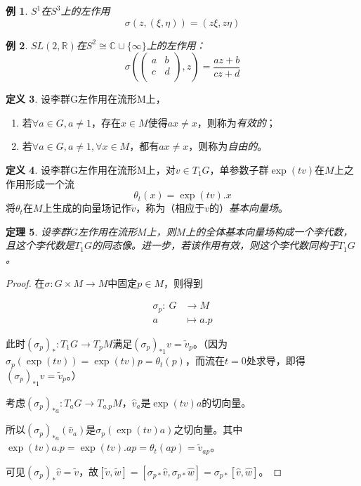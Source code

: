 \documentclass[winfonts,UTF8,c5size,a4paper,fancyhdr,hyperref,titlepage,nocap]{ctexart}
\newtheorem{thm}{定理}
\newtheorem{exa}[thm]{例}
\theoremstyle{definition}
\newtheorem{defn}[thm]{定义}
\theoremstyle{remark}
\numberwithin{equation}{subsection}
\newcommand{\Real}{\mathbb{R}}
\newcommand{\Complex}{\mathbb{C}}
\newcommand{\red}{\color{red}}
\newcommand{\mapdes}[5]
  {
    \begin{align*}
      #1\colon\  #2 & \longrightarrow  #3 \\
            #4 & \mapsto  #5
    \end{align*}
  }
\begin{document}
\begin{exa}
  $S^1$在$S^3$上的左作用
\begin{equation*}
\sigma(z,(\xi,\eta))=(z\xi,z\eta)
\end{equation*}
\end{exa}

\begin{exa}
  $SL(2,\Real)$在$S^2\cong\Complex\cup\{\infty\}$上的左作用：
\begin{equation*}
\sigma(\begin{pmatrix}
         a & b \\
         c & d \\
       \end{pmatrix}
,z)=\frac{az+b}{cz+d}
\end{equation*}
\end{exa}

\begin{defn}
  设李群G左作用在流形M上，
\begin{enumerate}[1)]
    \setlength{\itemindent}{2ex}
    \item 若$\forall a\in G, a\neq1$，存在$x\in M$使得$ax\neq x$，则称为\emph{\red 有效的}；
    \item 若$\forall a\in G, a\neq1, \forall x\in M$，都有$ax\neq x$，则称为\emph{\red 自由的}。
\end{enumerate}
\end{defn}

\begin{defn}
  设李群G左作用在流形M上，对$v\in T_1G$，单参数子群$\exp(tv)$在$M$上之作用形成一个流
  \begin{equation*}
    \theta_t(x)=\exp(tv).x
  \end{equation*}
将$\theta_t$在$M$上生成的向量场记作$\widetilde{v}$，称为（相应于$v$的）\emph{\red 基本向量场}。
\end{defn}

\begin{thm}
  设李群$G$左作用在流形$M$上，则$M$上的全体基本向量场构成一个李代数，且这个李代数是$T_1G$的同态像。进一步，若该作用有效，则这个李代数同构于$T_1G$。
\end{thm}
\begin{proof}
  在$\sigma\colon G\times M\to M$中固定$p\in M$，则得到
\mapdes{\sigma_p}{G}{M}{a}{a.p}
此时$(\sigma_p)_{\ast}\colon T_1G\to T_pM$满足$(\sigma_p)_{\ast1}v=\widetilde{v}_p$。（因为$\sigma_p(\exp(tv))=\exp(tv)p=\theta_t(p)$，而流在$t=0$处求导，即得$(\sigma_p)_{\ast1}v=\widetilde{v}_p$。）

考虑$(\sigma_p)_{\ast a}\colon T_aG\to T_{a.p}M$，$\widehat{v}_a$是$\exp(tv)a$的切向量。

所以$(\sigma_p)_{\ast a}(\widehat{v}_a)$是$\sigma_p(\exp(tv)a)$之切向量。其中$\exp(tv)a.p=\exp(tv).ap=\theta_t(ap)=\widetilde{v}_{ap}$。

可见$(\sigma_p)_{\ast}\widehat{v}=\widetilde{v}$，故$[\widetilde{v},\widetilde{w}]=[\sigma_{p\ast}\widehat{v},\sigma_{p\ast}\widehat{w}]=\sigma_{p\ast}[\widehat{v},\widehat{w}]$。
\end{proof}
\end{document}
